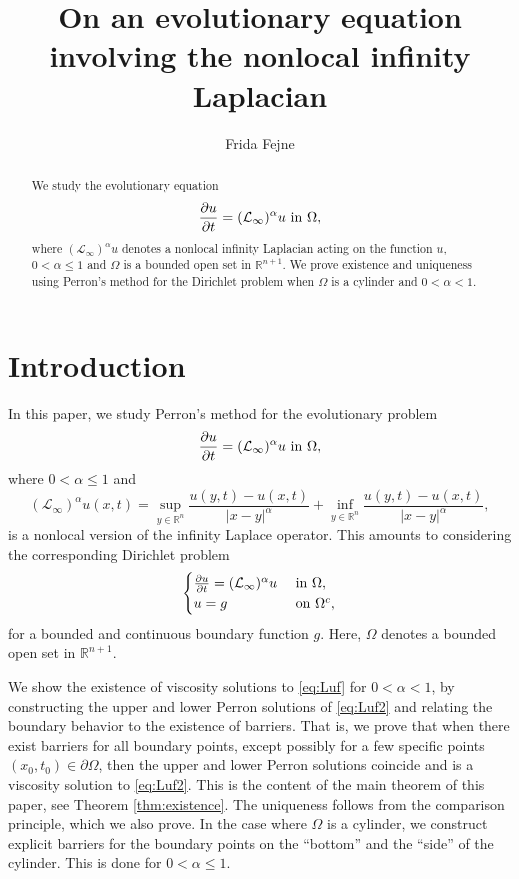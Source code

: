 \documentclass[11pt]{article}
\title{On an evolutionary equation involving the nonlocal infinity Laplacian}
\author{Frida Fejne}
\date{}
\providecommand{\Rn}{\mathbb{R}^n}
\numberwithin{equation}{section}
\theoremstyle{definition}
\begin{document}
\maketitle
\thispagestyle{empty}

\begin{abstract}
\noindent We study the evolutionary equation
\begin{align*} 
 \frac{\partial u}{\partial t} = (\mathcal{L}_{\infty})^{\alpha}u   \textup{ in }  \Omega,
\end{align*}
where $(\mathcal{L}_{\infty})^{\alpha}u$ denotes a nonlocal infinity Laplacian acting on the function $u$, $0<\alpha \leq 1$ and $\Omega$ is a bounded open set in $\mathbb{R}^{n+1}$. We prove existence and uniqueness using Perron's method for the Dirichlet problem when $\Omega$ is a cylinder and $0<\alpha<1$.
\end{abstract}
\section{Introduction}
In this paper, we study Perron's method for the evolutionary problem  
\begin{align} \label{eq:Luf} 
 \frac{\partial u}{\partial t} = (\mathcal{L}_{\infty})^{\alpha}u   \textup{ in }  \Omega,
\end{align}
where $0<\alpha \leq 1$ and
\begin{equation} \label{eq:infinitylap}
(\mathcal{L}_{\infty})^{\alpha}u(x,t) = \sup_{y \in \Rn} \frac{u(y,t)-u(x,t)}{|x-y|^{\alpha}} + \inf_{y \in \Rn} \frac{u(y,t)-u(x,t)}{|x-y|^{\alpha}},
\end{equation}
 is a nonlocal version of the infinity Laplace operator. This amounts to considering the corresponding Dirichlet problem
\begin{align} \label{eq:Luf2} 
\begin{cases}
 \frac{\partial u}{\partial t} = (\mathcal{L}_{\infty})^{ \alpha}u &  \textup{ in }  \Omega, \\
 u = g &  \textup{ on }  \Omega^c,
\end{cases}
\end{align}
for a bounded and continuous boundary function $g$. Here, $\Omega$ denotes a bounded open set in $\mathbb{R}^{n+1}$.

We show the existence of viscosity solutions to \eqref{eq:Luf} for $0 < \alpha <1$, by constructing the upper and lower Perron solutions of \eqref{eq:Luf2} and relating the boundary behavior to the existence of barriers. That is, we prove that when there exist barriers for all boundary points, except possibly for a few specific points $(x_0,t_0) \in \partial \Omega$, then the upper and lower Perron solutions coincide and is a viscosity solution to \eqref{eq:Luf2}.  This is the content of the main theorem of this paper, see Theorem \ref{thm:existence}. The uniqueness follows from the comparison principle, which we also prove. In the case where $\Omega$ is a cylinder, we construct explicit barriers for the boundary points on the ``bottom'' and the ``side'' of the cylinder. This is done for $0<\alpha \leq 1$. 
\end{document}
